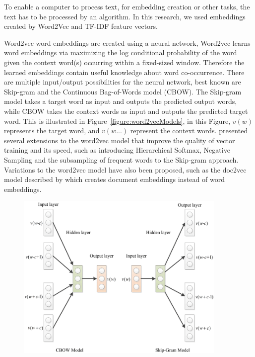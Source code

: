 \documentclass[../../Thesis.tex]{subfiles}
\begin{document}
To enable a computer to process text, for embedding creation or other tasks, the text has to be processed by an algorithm. In this research, we used embeddings created by Word2Vec and TF-IDF feature vectors.
\begin{jumpin}
Word2vec word embeddings are created using a neural network, Word2vec learns word embeddings via maximizing the log conditional probability of the word given the context word(s) occurring within a fixed-sized window. Therefore the learned embeddings contain useful knowledge about word co-occurrence\cite{nalisnick2016improving}. There are multiple input/output possibilities for the neural network, best known are Skip-gram and the Continuous Bag-of-Words model (CBOW). The Skip-gram model takes a target word as input and outputs the predicted output words, while CBOW takes the context words as input and outputs the predicted target word\cite{nalisnick2016improving, pennington2014glove}. This is illustrated in Figure~\ref{figure:word2vecModels}, in this Figure, $v(w)$ represents the target word, and $v(w...)$ represent the context words. \citet{mikolov2013distributed}\cite{mikolov2013efficient} presented several extensions to the word2vec model that improve the quality of vector training and its speed, such as introducing Hierarchical Softmax, Negative Sampling and the subsampling of frequent words to the Skip-gram approach. Variations to the word2vec model have also been proposed, such as the doc2vec model described by \citet{lau2016empirical} which creates document embeddings instead of word embeddings.
\begin{center}
\begin{figure}[hbt]
\includegraphics[width=4in]{Plots/Model-Architecture-of-CBOW-and-Skip-Gram.png}

\end{figure}
\end{center}
\end{jumpin}
\end{document}
